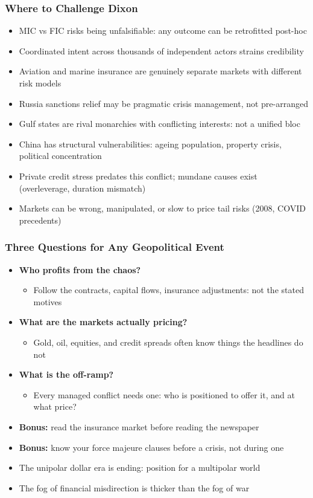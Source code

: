 \begin{frame}[fragile]\frametitle{Where to Challenge Dixon}
  \begin{itemize}
    \item MIC vs FIC risks being unfalsifiable: any outcome can be retrofitted post-hoc
    \item Coordinated intent across thousands of independent actors strains credibility
    \item Aviation and marine insurance are genuinely separate markets with different risk models
    \item Russia sanctions relief may be pragmatic crisis management, not pre-arranged
    \item Gulf states are rival monarchies with conflicting interests: not a unified bloc
    \item China has structural vulnerabilities: ageing population, property crisis, political concentration
    \item Private credit stress predates this conflict; mundane causes exist (overleverage, duration mismatch)
    \item Markets can be wrong, manipulated, or slow to price tail risks (2008, COVID precedents)
  \end{itemize}
\end{frame}

\begin{frame}[fragile]\frametitle{Three Questions for Any Geopolitical Event}
  \begin{itemize}
    \item \textbf{Who profits from the chaos?}
      \begin{itemize}
        \item Follow the contracts, capital flows, insurance adjustments: not the stated motives
      \end{itemize}
    \item \textbf{What are the markets actually pricing?}
      \begin{itemize}
        \item Gold, oil, equities, and credit spreads often know things the headlines do not
      \end{itemize}
    \item \textbf{What is the off-ramp?}
      \begin{itemize}
        \item Every managed conflict needs one: who is positioned to offer it, and at what price?
      \end{itemize}
    \item \textbf{Bonus:} read the insurance market before reading the newspaper
    \item \textbf{Bonus:} know your force majeure clauses before a crisis, not during one
    \item The unipolar dollar era is ending: position for a multipolar world
    \item The fog of financial misdirection is thicker than the fog of war
  \end{itemize}
\end{frame}

